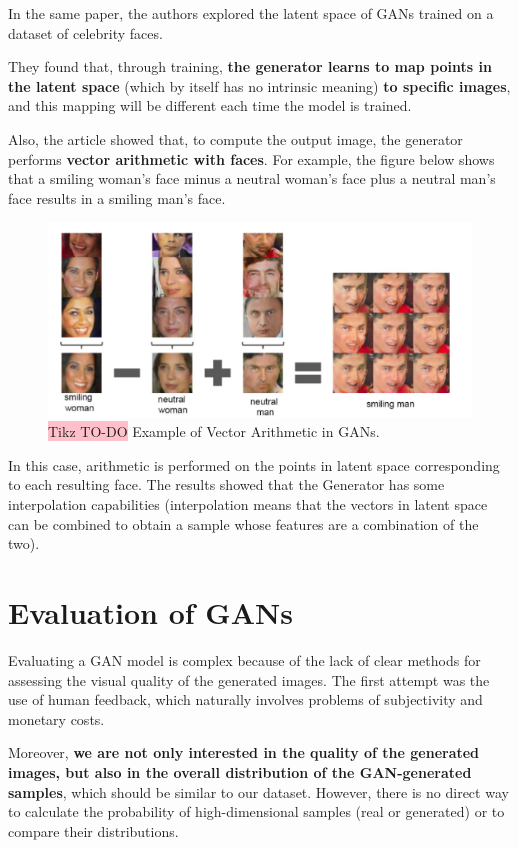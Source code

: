 In the same paper, the authors explored the latent space of GANs trained on a dataset of celebrity faces. 

They found that, through training, \textbf{the generator learns to map points in the latent space} (which by itself has no intrinsic meaning) \textbf{to specific images}, and this mapping will be different each time the model is trained.

Also, the article showed that, to compute the output image, the generator performs \textbf{vector arithmetic with faces}. For example, the figure below shows that a smiling woman's face minus a neutral woman's face plus a neutral man's face results in a smiling man's face.

\begin{figure}[!htbp]
    \centering
    \includegraphics[width=0.8\linewidth]{tikz/chapter9 - Arithmetics of GAN.png}
    \caption{{\color{red}\colorbox{pink}{Tikz TO-DO}} Example of Vector Arithmetic in GANs.}
\end{figure}

In this case, arithmetic is performed on the points in latent space corresponding to each resulting face. The results showed that the Generator has some interpolation capabilities (interpolation means that the vectors in latent space can be combined to obtain a sample whose features are a combination of the two).

\section{Evaluation of GANs}

Evaluating a GAN model is complex because of the lack of clear methods for assessing the visual quality of the generated images. The first attempt was the use of human feedback, which naturally involves problems of subjectivity and monetary costs.

Moreover, \textbf{we are not only interested in the quality of the generated images, but also in the overall distribution of the GAN-generated samples}, which should be similar to our dataset. However, there is no direct way to calculate the probability of high-dimensional samples (real or generated) or to compare their distributions.

